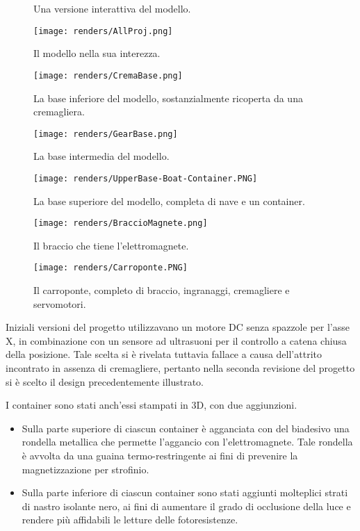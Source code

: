 \begin{figure}[htbp]\centering
    \caption{Una versione interattiva del modello.}\label{fig:qrcode-sketchfab}
\end{figure}

\begin{figure}[!hbtp]\centering
    \caption{Il modello nella sua interezza.}\label{fig:allproj}
    \texttt{[image: renders/AllProj.png]}
\end{figure}
\begin{figure}[!hbtp]\centering
    \caption{La base inferiore del modello, sostanzialmente ricoperta da una cremagliera.}\label{fig:cremabase}
    \texttt{[image: renders/CremaBase.png]}
\end{figure}
\begin{figure}[!hbtp]\centering
    \caption{La base intermedia del modello.}\label{fig:gearbase}
    \texttt{[image: renders/GearBase.png]}
\end{figure}
\begin{figure}[!hbtp]\centering
    \caption{La base superiore del modello, completa di nave e un container.}\label{fig:upperbase}
    \texttt{[image: renders/UpperBase-Boat-Container.PNG]}
\end{figure}
\begin{figure}[!hbtp]\centering
    \caption{Il braccio che tiene l'elettromagnete.}\label{fig:magnetarm}
    \texttt{[image: renders/BraccioMagnete.png]}
\end{figure}
\begin{figure}[!hbtp]\centering
    \caption{Il carroponte, completo di braccio, ingranaggi, cremagliere e servomotori.}\label{fig:carroponte}
    \texttt{[image: renders/Carroponte.PNG]}
\end{figure}

Iniziali versioni del progetto utilizzavano un motore DC senza spazzole per l'asse X, in
combinazione con un sensore ad ultrasuoni per il controllo a catena chiusa della posizione. Tale
scelta si è rivelata tuttavia fallace a causa dell'attrito incontrato in assenza di cremagliere,
pertanto nella seconda revisione del progetto si è scelto il design precedentemente illustrato.

\enlargethispage{3\baselineskip}
I container sono stati anch'essi stampati in 3D, con due aggiunzioni.
\begin{itemize}
    \item Sulla parte superiore di ciascun container è agganciata con del biadesivo una rondella
        metallica che permette l'aggancio con l'elettromagnete. Tale rondella è avvolta da una
        guaina termo-restringente ai fini di prevenire la magnetizzazione per strofinio.
    \item Sulla parte inferiore di ciascun container sono stati aggiunti molteplici strati di nastro
        isolante nero, ai fini di aumentare il grado di occlusione della luce e rendere più
        affidabili le letture delle fotoresistenze.
\end{itemize}

